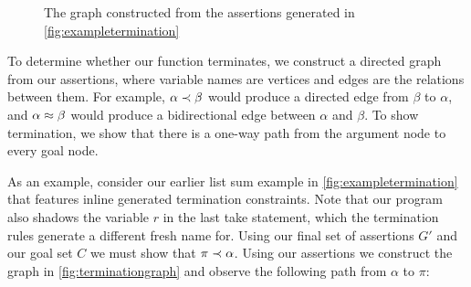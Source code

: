 \begin{figure}
    \centering
    
    \caption{The graph constructed from the assertions generated in \autoref{fig:exampletermination}}
    \label{fig:terminationgraph}
\end{figure}

\FloatBarrier

To determine whether our function terminates, we construct a directed graph from
our assertions, where variable names are vertices and edges are the relations
between them. For example, $\alpha \prec \beta$ would produce a directed edge from
$\beta$ to $\alpha$, and $\alpha \approx \beta$ would produce a bidirectional edge between 
$\alpha$ and $\beta$. To show termination, we show that there is a one-way path
from the argument node to every goal node.

As an example, consider our earlier list sum example in \autoref{fig:exampletermination}
that features inline generated termination constraints. Note that our program also shadows
the variable $r$ in the last \textsf{take} statement, which the termination
rules generate a different fresh name for. Using our final set of assertions
$G'$ and our goal set $C$ we must show that $\pi \prec \alpha$.
Using our assertions we construct the graph in \autoref{fig:terminationgraph}
and observe the following path from $\alpha$ to $\pi$:

